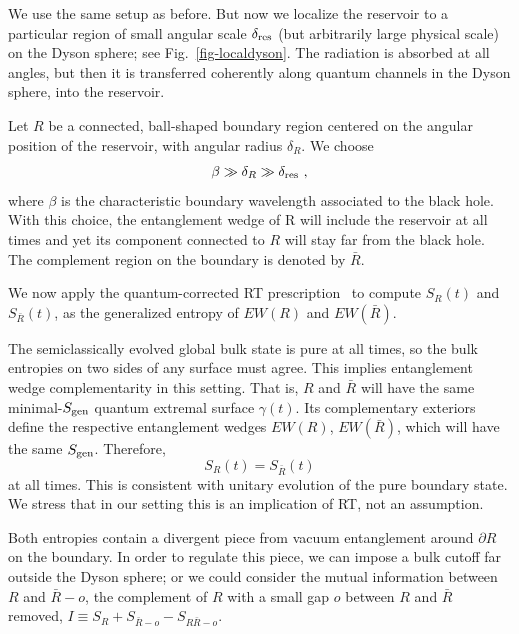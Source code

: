 \documentclass[12pt,letterpaper]{article}
\begin{document}
We use the same setup as before. But now we localize the reservoir to a particular region of small angular scale $\delta_{\rm res}$ (but arbitrarily large physical scale) on the Dyson sphere; see Fig.~\ref{fig-localdyson}.  The radiation is absorbed at all angles, but then it is transferred coherently along quantum channels in the Dyson sphere, into the reservoir. 

Let $R$ be a connected, ball-shaped boundary region centered on the angular position of the reservoir, with angular radius $\delta_R$. We choose
\begin{equation}
  \beta\gg \delta_R\gg \delta_{\rm res}~,
\end{equation}
where $\beta$ is the characteristic boundary wavelength associated to the black hole. With this choice, the entanglement wedge of R will include the reservoir at all times and yet its component connected to $R$ will stay far from the black hole. The complement region on the boundary is denoted by $\bar R$.

We now apply the quantum-corrected RT prescription~\cite{FauLew13,EngWal14} to compute $S_R(t)$ and $S_{\bar R}(t)$, as the generalized entropy of $EW(R)$ and $EW(\bar R)$.

The semiclassically evolved global bulk state is pure at all times, so the bulk entropies on two sides of any surface must agree. This implies entanglement wedge complementarity in this setting. That is, $R$ and $\bar R$ will have the same minimal-$S_{\rm gen}$ quantum extremal surface $\gamma(t)$. Its complementary exteriors define the respective entanglement wedges $EW(R)$, $EW(\bar R)$, which will have the same $S_{\rm gen}$. Therefore,
\begin{equation}
  S_R(t)=S_{\bar R}(t)
\end{equation}
at all times. This is consistent with unitary evolution of the pure boundary state. We stress that in our setting this is an implication of RT, not an assumption.

Both entropies contain a divergent piece from vacuum entanglement around $\partial R$ on the boundary. In order to regulate this piece, we can impose a bulk cutoff far outside the Dyson sphere; or we could consider the mutual information between $R$ and $\bar R-o$, the complement of $R$ with a small gap $o$ between $R$ and $\bar R$ removed, $I \equiv S_R+S_{\bar R-o} -S_{R\bar R-o}$.
\end{document}
